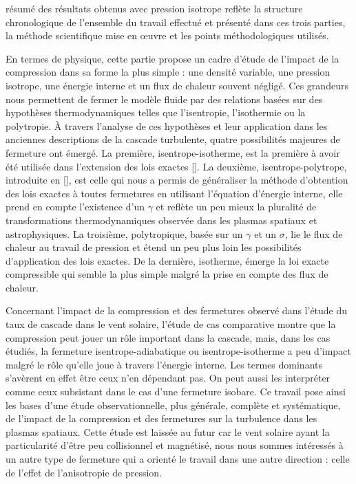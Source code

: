 résumé des résultats obtenus avec pression isotrope reflète la structure chronologique de l'ensemble du travail effectué et présenté dans ces trois parties, la méthode scientifique mise en œuvre et les points méthodologiques utilisés. 

En termes de physique, cette partie propose un cadre d'étude de l'impact de la compression dans sa forme la plus \og simple \fg{} : une densité variable, une pression isotrope, une énergie interne et un flux de chaleur souvent négligé. Ces grandeurs nous permettent de fermer le modèle fluide par des relations basées sur des hypothèses thermodynamiques telles que l'isentropie, l'isothermie ou la polytropie. À travers l'analyse de ces hypothèses et leur application dans les anciennes descriptions de la cascade turbulente, quatre possibilités majeures de fermeture ont émergé. La première, isentrope-isotherme, est la première à avoir été utilisée dans l'extension des lois exactes [\cite{galtier_exact_2011,banerjee_exact_2013,andres_alternative_2017}]. La deuxième, isentrope-polytrope, introduite en  [\cite{banerjee_kolmogorov-like_2014}], est celle qui nous a permis de généraliser la méthode d'obtention des lois exactes à toutes fermetures en utilisant l'équation d'énergie interne, elle prend en compte l'existence d'un $\gamma$ et reflète un peu mieux la pluralité de transformations thermodynamiques observée dans les plasmas spatiaux et astrophysiques. La troisième, polytropique, basée sur un $\gamma$ et un $\sigma$, lie le flux de chaleur au travail de pression et étend un peu plus loin les possibilités d'application des lois exactes. De la dernière, isotherme, émerge la loi exacte compressible qui semble la plus simple malgré la prise en compte des flux de chaleur. 

Concernant l'impact de la compression et des fermetures observé dans l'étude du taux de cascade dans le vent solaire, l'étude de cas comparative montre que la compression peut jouer un rôle important dans la cascade, mais, dans les cas étudiés, la fermeture isentrope-adiabatique ou isentrope-isotherme a peu d'impact malgré le rôle qu'elle joue à travers l'énergie interne. Les termes dominants s'avèrent en effet être ceux n'en dépendant pas. On peut aussi les interpréter comme ceux subsistant dans le cas d'une fermeture isobare. Ce travail pose ainsi les bases d'une étude observationnelle, plus générale, complète et systématique, de l'impact de la compression et des fermetures sur la turbulence dans les plasmas spatiaux. Cette étude est laissée au futur car le vent solaire ayant la particularité d'être peu collisionnel et magnétisé, nous nous sommes intéressés à un autre type de fermeture qui a orienté le travail dans une autre direction : celle de l'effet de l'anisotropie de pression.  










